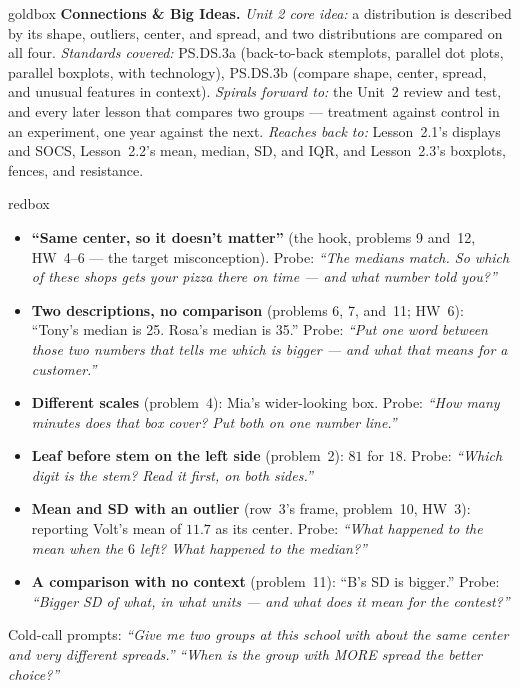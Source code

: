 \documentclass[10pt]{article}
\begin{document}
\begin{skillbox}{goldbox}
\textbf{Connections \& Big Ideas.} \textit{Unit 2 core idea:} a distribution is described by
its shape, outliers, center, and spread, and two distributions are compared on all four.
\textit{Standards covered:} PS.DS.3a (back-to-back stemplots, parallel dot plots, parallel
boxplots, with technology), PS.DS.3b (compare shape, center, spread, and unusual features in
context). \textit{Spirals forward to:} the Unit~2 review and test, and every later lesson
that compares two groups --- treatment against control in an experiment, one year against
the next. \textit{Reaches back to:} Lesson~2.1's displays and SOCS, Lesson~2.2's mean,
median, SD, and IQR, and Lesson~2.3's boxplots, fences, and resistance.
\end{skillbox}

\boxguard
\begin{skillbox}{redbox}
\begin{itemize}[leftmargin=1.2em, nosep]
  \item \textbf{``Same center, so it doesn't matter''} (the hook, problems 9 and~12, HW~4--6
        --- the target misconception). Probe: \emph{``The medians match. So which of these
        shops gets your pizza there on time --- and what number told you?''}
  \item \textbf{Two descriptions, no comparison} (problems 6, 7, and~11; HW~6):
        ``Tony's median is 25. Rosa's median is 35.'' Probe: \emph{``Put one word between those
        two numbers that tells me which is bigger --- and what that means for a customer.''}
  \item \textbf{Different scales} (problem~4): Mia's wider-looking box. Probe: \emph{``How many
        minutes does that box cover? Put both on one number line.''}
  \item \textbf{Leaf before stem on the left side} (problem~2): $81$ for $18$. Probe:
        \emph{``Which digit is the stem? Read it first, on both sides.''}
  \item \textbf{Mean and SD with an outlier} (row~3's frame, problem~10, HW~3): reporting Volt's mean of
        $11.7$ as its center. Probe: \emph{``What happened to the mean when the $6$ left?
        What happened to the median?''}
  \item \textbf{A comparison with no context} (problem~11): ``B's SD is bigger.''
        Probe: \emph{``Bigger SD of what, in what units --- and what does it mean for the
        contest?''}
\end{itemize}
Cold-call prompts: \emph{``Give me two groups at this school with about the same center and
very different spreads.''} \quad \emph{``When is the group with MORE spread the better
choice?''}
\end{skillbox}
\end{document}
